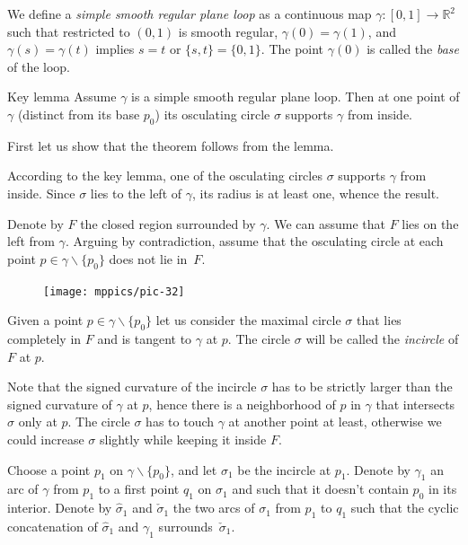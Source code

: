 \documentclass{article}
\begin{document}
We define a \emph{simple smooth regular plane loop} as a continuous map $\gamma : [0,1]\to \mathbb{R}^2$ such that restricted to $(0,1)$ is smooth regular, $\gamma (0) = \gamma (1)$, and $\gamma (s) = \gamma (t)$ implies $s=t$ or $\{ s,t \} = \{ 0,1 \}$. The point $\gamma (0)$ is called the \emph{base} of the loop.





\begin{thm}{Key lemma}\label{thm:moon}
Assume $\gamma$ is a simple smooth regular plane loop.
Then at one point of $\gamma$ (distinct from its base $p_0$) its osculating circle $\sigma$ %
 supports $\gamma$ from inside.
\end{thm}

First let us show that the theorem follows from the lemma.

According to the key lemma, one of the osculating circles $\sigma$ supports $\gamma$ from inside. Since $\sigma$ lies to the left of $\gamma$, its radius is at least one, whence the result.
\qeds

Denote by $F$ the closed region surrounded by $\gamma$.
We can assume that $F$ lies on the left from $\gamma$.
Arguing by contradiction,
assume that the osculating circle at each point $p\in \gamma \backslash \{ p_0 \}$ does not lie in~$F$.

\begin{figure}[!ht]%
\vskip-0mm
\centering
\texttt{[image: mppics/pic-32]}
\vskip0mm
\end{figure}

Given a point $p\in\gamma \backslash \{ p_0 \} $ let us consider the maximal circle $\sigma$ that lies completely in $F$ and is tangent to $\gamma$ at $p$.
The circle $\sigma$ will be called the {}\emph{incircle} of $F$ at $p$.

Note that the signed curvature of the incircle $\sigma$ has to be strictly larger than the signed curvature of $\gamma$ at $p$, hence there is a neighborhood of $p$ in $\gamma$ that intersects $\sigma$ only at $p$.
The circle $\sigma$ has to touch $\gamma$ at another point at least,
otherwise we could increase $\sigma$ slightly while keeping it inside $F$.

Choose a point $p_1$ on $\gamma \backslash \{ p_0 \} $, and  let $\sigma_1$ be the incircle at $p_1$.
Denote by $\gamma_1$ an arc of $\gamma$ from $p_1$ to a first point $q_1$ on $\sigma_1$ and such that it doesn't contain $p_0$ in its interior. %
Denote by $\hat\sigma_1$ and $\check\sigma_1$ the two arcs of $\sigma_1$ from $p_1$ to $q_1$ such that the cyclic concatenation of $\hat\sigma_1$ and $\gamma_1$ surrounds~$\check\sigma_1$.
\end{document}
